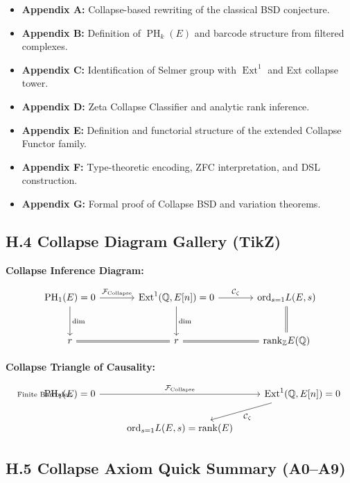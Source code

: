 \documentclass[11pt]{article}
\DeclareMathOperator{\Ext}{Ext}
\DeclareMathOperator{\PH}{PH}
\newcommand{\QQ}{\mathbb{Q}}
\newcommand{\ZZ}{\mathbb{Z}}
\begin{document}
\begin{itemize}
  \item \textbf{Appendix A:} Collapse-based rewriting of the classical BSD conjecture.
  \item \textbf{Appendix B:} Definition of $\PH_k(E)$ and barcode structure from filtered complexes.
  \item \textbf{Appendix C:} Identification of Selmer group with $\Ext^1$ and Ext collapse tower.
  \item \textbf{Appendix D:} Zeta Collapse Classifier and analytic rank inference.
  \item \textbf{Appendix E:} Definition and functorial structure of the extended Collapse Functor family.
  \item \textbf{Appendix F:} Type-theoretic encoding, ZFC interpretation, and DSL construction.
  \item \textbf{Appendix G:} Formal proof of Collapse BSD and variation theorems.
\end{itemize}

\subsection*{H.4 Collapse Diagram Gallery (TikZ)}

\vspace{0.5em}
\noindent \textbf{Collapse Inference Diagram:}

\[
\begin{tikzcd}[row sep=large, column sep=large]
\PH_1(E) = 0 \arrow[r, "\mathcal{F}_{\mathrm{Collapse}}"] \arrow[d, "\dim"]
& \Ext^1(\QQ,E[n]) = 0 \arrow[d, "\dim"] \arrow[r, "\mathcal{C}_\zeta"]
& \mathrm{ord}_{s=1} L(E,s) \arrow[d, equal] \\
r \arrow[r, equal] & r \arrow[r, equal] & \mathrm{rank}_{\ZZ} E(\QQ)
\end{tikzcd}
\]

\vspace{1em}
\noindent \textbf{Collapse Triangle of Causality:}

\[
\begin{tikzcd}
\PH_1(E) = 0 \arrow[rr, "\mathcal{F}_{\mathrm{Collapse}}"] \arrow[ "\text{Finite Barcode}"]
& & \Ext^1(\QQ,E[n]) = 0 \arrow[dl, "\mathcal{C}_\zeta"] \\
& \mathrm{ord}_{s=1} L(E,s) = \mathrm{rank}(E) &
\end{tikzcd}
\]

\subsection*{H.5 Collapse Axiom Quick Summary (A0--A9)}
\end{document}
